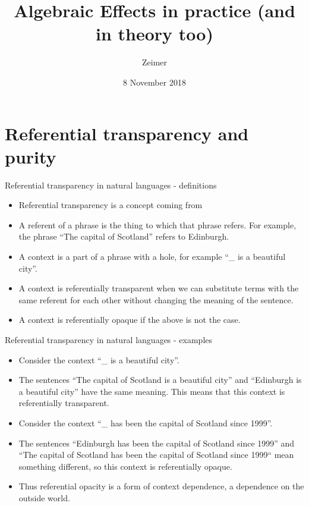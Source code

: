 \documentclass{beamer}
\title{Algebraic Effects in practice (and in theory too)}
\author{Zeimer}
\date{8 November 2018}
\newcommand{\link}[2]{\href{#2}{\color{blue}{#1}}}
\begin{document}
\frame{\titlepage}

\frame{\tableofcontents}

\section{Referential transparency and purity}

\begin{frame}{Referential transparency in natural languages - definitions}
\begin{itemize}
	\item Referential transparency is a concept coming from \link{analytic philosophy}{https://en.wikipedia.org/wiki/Analytic_philosophy}
	\item A referent of a phrase is the thing to which that phrase refers. For example, the phrase ``The capital of Scotland'' refers to Edinburgh.
	\item A context is a part of a phrase with a hole, for example ``\_ is a beautiful city''.
	\item A context is referentially transparent when we can substitute terms with the same referent for each other without changing the meaning of the sentence.
	\item A context is referentially opaque if the above is not the case.
\end{itemize}
\end{frame}

\begin{frame}{Referential transparency in natural languages - examples}
\begin{itemize}
	\item Consider the context ``\_ is a beautiful city''.
	\item The sentences ``The capital of Scotland is a beautiful city'' and ``Edinburgh is a beautiful city'' have the same meaning. This means that this context is referentially transparent.
	\item Consider the context ``\_ has been the capital of Scotland since 1999''.
	\item The sentences ``Edinburgh has been the capital of Scotland since 1999'' and ``The capital of Scotland has been the capital of Scotland since 1999`` mean something different, so this context is referentially opaque.
	\item Thus referential opacity is a form of context dependence, a dependence on the outside world.
\end{itemize}
\end{frame}
\end{document}
